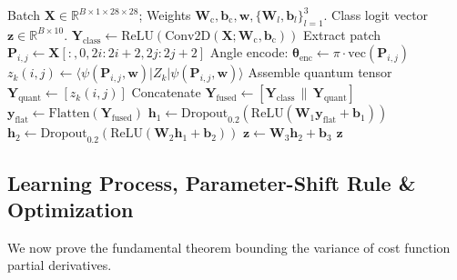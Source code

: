 \documentclass[pdflatex,sn-mathphys-num]{sn-jnl}%
\theoremstyle{thmstyleone}%
\theoremstyle{thmstyletwo}%
\theoremstyle{thmstylethree}%
\begin{document}
\begin{algorithm}[htbp]
\caption{QC-CNN-Parallel Forward Inference and Feature Fusion}
\label{alg:forward_pass}
\begin{algorithmic}[1]
\REQUIRE Batch $\mathbf{X} \in \mathbb{R}^{B \times 1 \times 28 \times 28}$; Weights $\mathbf{W}_{\mathrm{c}}, \mathbf{b}_{\mathrm{c}}, \mathbf{w}, \{\mathbf{W}_l, \mathbf{b}_l\}_{l=1}^3$.
\ENSURE Class logit vector $\mathbf{z} \in \mathbb{R}^{B \times 10}$.
\STATE {}
\STATE $\mathbf{Y}_{\mathrm{class}} \leftarrow \mathrm{ReLU}(\mathrm{Conv2D}(\mathbf{X}; \mathbf{W}_{\mathrm{c}}, \mathbf{b}_{\mathrm{c}}))$
\STATE {}
        \STATE Extract patch $\mathbf{P}_{i,j} \leftarrow \mathbf{X}[:, 0, 2i:2i+2, 2j:2j+2]$
        \STATE Angle encode: $\boldsymbol{\theta}_{\mathrm{enc}} \leftarrow \pi \cdot \mathrm{vec}(\mathbf{P}_{i,j})$
            \STATE $z_k(i, j) \leftarrow \langle \psi(\mathbf{P}_{i,j}, \mathbf{w}) | Z_k | \psi(\mathbf{P}_{i,j}, \mathbf{w}) \rangle$
        \ENDFOR
    \ENDFOR
\ENDFOR
\STATE Assemble quantum tensor $\mathbf{Y}_{\mathrm{quant}} \leftarrow [z_k(i, j)]$
\STATE {}
\STATE Concatenate $\mathbf{Y}_{\mathrm{fused}} \leftarrow [\mathbf{Y}_{\mathrm{class}} \,\|\, \mathbf{Y}_{\mathrm{quant}}]$
\STATE $\mathbf{y}_{\mathrm{flat}} \leftarrow \mathrm{Flatten}(\mathbf{Y}_{\mathrm{fused}})$
\STATE $\mathbf{h}_1 \leftarrow \mathrm{Dropout}_{0.2}(\mathrm{ReLU}(\mathbf{W}_1 \mathbf{y}_{\mathrm{flat}} + \mathbf{b}_1))$
\STATE $\mathbf{h}_2 \leftarrow \mathrm{Dropout}_{0.2}(\mathrm{ReLU}(\mathbf{W}_2 \mathbf{h}_1 + \mathbf{b}_2))$
\STATE $\mathbf{z} \leftarrow \mathbf{W}_3 \mathbf{h}_2 + \mathbf{b}_3$
\RETURN $\mathbf{z}$
\end{algorithmic}
\end{algorithm}

\subsection{Learning Process, Parameter-Shift Rule \& Optimization}
We now prove the fundamental theorem bounding the variance of cost function partial derivatives.
\end{document}
